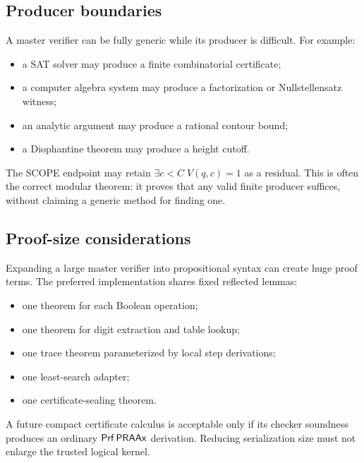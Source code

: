 \subsection{Producer boundaries}

A master verifier can be fully generic while its producer is difficult.  For example:

\begin{itemize}
\item a SAT solver may produce a finite combinatorial certificate;
\item a computer algebra system may produce a factorization or Nullstellensatz witness;
\item an analytic argument may produce a rational contour bound;
\item a Diophantine theorem may produce a height cutoff.
\end{itemize}

The SCOPE endpoint may retain \(\exists c<C\;V(q,c)=1\) as a residual.  This is often the correct modular theorem: it proves that any valid finite producer suffices, without claiming a generic method for finding one.

\subsection{Proof-size considerations}

Expanding a large master verifier into propositional syntax can create huge proof terms.  The preferred implementation shares fixed reflected lemmas:

\begin{itemize}
\item one theorem for each Boolean operation;
\item one theorem for digit extraction and table lookup;
\item one trace theorem parameterized by local step derivations;
\item one least-search adapter;
\item one certificate-sealing theorem.
\end{itemize}

A future compact certificate calculus is acceptable only if its checker soundness produces an ordinary \(\mathsf{Prf}\,\mathsf{PRAAx}\) derivation.  Reducing serialization size must not enlarge the trusted logical kernel.
